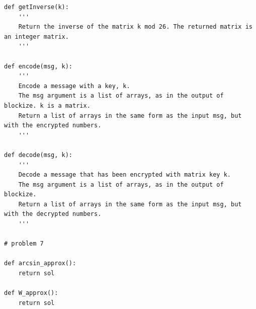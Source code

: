 \begin{lstlisting}
def getInverse(k):
    '''
    Return the inverse of the matrix k mod 26. The returned matrix is an integer matrix.
    '''

def encode(msg, k):
    '''
    Encode a message with a key, k. 
    The msg argument is a list of arrays, as in the output of blockize. k is a matrix. 
    Return a list of arrays in the same form as the input msg, but with the encrypted numbers.
    '''

def decode(msg, k):
    '''
    Decode a message that has been encrypted with matrix key k.
    The msg argument is a list of arrays, as in the output of blockize.
    Return a list of arrays in the same form as the input msg, but with the decrypted numbers.
    '''
	
# problem 7

def arcsin_approx():
	return sol

def W_approx():
	return sol

\end{lstlisting}
